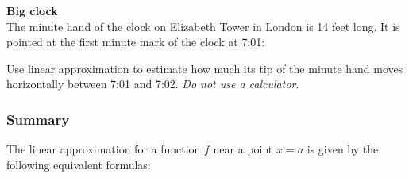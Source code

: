 \documentclass[pdftex, brazil, 12pt, twoside]{article}
\begin{document}
\begin{exercise}
  \textbf{Big clock}\\%
  The minute hand of the clock on Elizabeth Tower in London is 14 feet long.
  It is pointed at the first minute mark of the clock at 7:01:
\begin{figure}[H]
  \begin{center}
  \end{center}
\end{figure}
  Use linear approximation to estimate how much its tip of the minute hand moves
  horizontally between 7:01 and 7:02. \emph{Do not use a calculator}.
\end{exercise}

\subsubsection{Summary}
\label{u2-linear-summary}

The linear approximation for a function $f$ near a point $x=a$ is given by the
following equivalent formulas:

\begin{figure}[H]
  \begin{center}
  \end{center}
\end{figure}
\end{document}
